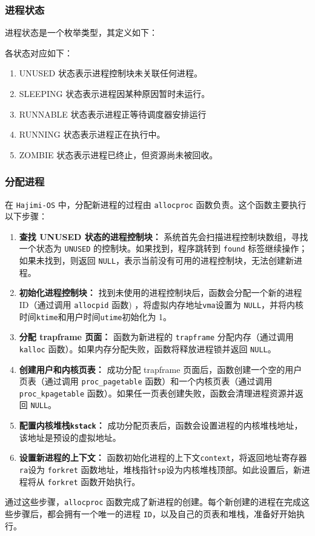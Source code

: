 \documentclass[UTF8]{article}
\begin{document}
\subsubsection{进程状态}
进程状态是一个枚举类型，其定义如下：

各状态对应如下：
\begin{enumerate}[label=\textbf{\arabic*}., wide, labelwidth=!, labelindent=0pt]
  \item UNUSED 状态表示进程控制块未关联任何进程。
  \item SLEEPING 状态表示进程因某种原因暂时未运行。
  \item RUNNABLE 状态表示进程正等待调度器安排运行
  \item RUNNING 状态表示进程正在执行中。
  \item ZOMBIE 状态表示进程已终止，但资源尚未被回收。
\end{enumerate}
\subsubsection{分配进程}
在 \texttt{Hajimi-OS} 中，分配新进程的过程由 \texttt{allocproc} 函数负责。这个函数主要执行以下步骤：
\begin{enumerate}[label=\textbf{\arabic*}., wide, labelwidth=!, labelindent=0pt]
  \item \textbf{查找 UNUSED 状态的进程控制块：} 系统首先会扫描进程控制块数组，寻找一个状态为 \texttt{UNUSED} 的控制块。如果找到，程序跳转到 \texttt{found} 标签继续操作；如果未找到，则返回 \texttt{NULL}，表示当前没有可用的进程控制块，无法创建新进程。
  \item \textbf{初始化进程控制块：} 找到未使用的进程控制块后，函数会分配一个新的进程 ID（通过调用 \texttt{allocpid} 函数) ，将虚拟内存地址\texttt{vma}设置为 \texttt{NULL}，并将内核时间\texttt{ktime}和用户时间\texttt{utime}初始化为 1。
  \item \textbf{分配 trapframe 页面：} 函数为新进程的 \texttt{trapframe} 分配内存（通过调用 \texttt{kalloc} 函数）。如果内存分配失败，函数将释放进程锁并返回 \texttt{NULL}。
  \item \textbf{创建用户和内核页表：} 成功分配 trapframe 页面后，函数创建一个空的用户页表（通过调用 \texttt{proc\_pagetable} 函数）和一个内核页表（通过调用 \texttt{proc\_kpagetable} 函数）。如果任一页表创建失败，函数会清理进程资源并返回 \texttt{NULL}。
  \item \textbf{配置内核堆栈\texttt{kstack}：} 成功分配页表后，函数会设置进程的内核堆栈地址，该地址是预设的虚拟地址。
  \item \textbf{设置新进程的上下文：} 函数初始化进程的上下文\texttt{context}，将返回地址寄存器\texttt{ra}设为 \texttt{forkret} 函数地址，堆栈指针\texttt{sp}设为内核堆栈顶部。如此设置后，新进程将从 \texttt{forkret} 函数开始执行。
\end{enumerate}
通过这些步骤，\texttt{allocproc} 函数完成了新进程的创建。每个新创建的进程在完成这些步骤后，都会拥有一个唯一的进程 \texttt{ID}，以及自己的页表和堆栈，准备好开始执行。
\end{document}
